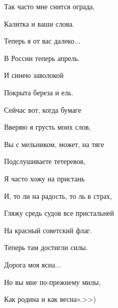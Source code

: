 \documentclass[a4paper,12pt]{article}
\begin{document}
	\noindent
	Так часто мне снится ограда,
	
	\noindent
	Калитка и ваши слова.
	
	\noindent
	Теперь я от вас далеко...
	
	\noindent
	В России теперь апрель.
	
	\noindent
	И синею заволокой
	
	\noindent
	Покрыта береза и ель.
	
	\noindent
	Сейчас вот, когда бумаге
	
	\noindent
	Вверяю я грусть моих слов,
	
	\noindent
	Вы с мельником, может, на тяге
	
	\noindent
	Подслушиваете тетеревов,
	
	\noindent
	Я часто хожу на пристань
	
	\noindent
	И, то ли на радость, то ль в страх,
	
	\noindent
	Гляжу средь судов все пристальней
	
	\noindent
	На красный советский флаг.
	
	\noindent
	Теперь там достигли силы.
	
	\noindent
	Дорога моя ясна...
	
	\noindent
	Но вы мне по-прежнему милы,
	
	\noindent
	Как родина и как весна».>>)
	
\end{document}
